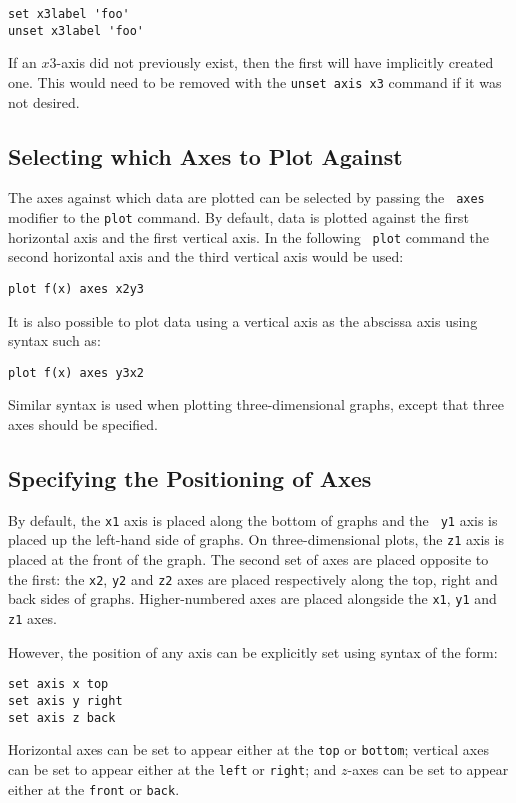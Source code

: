 \begin{verbatim}
set x3label 'foo'
unset x3label 'foo'
\end{verbatim}

\noindent If an $x3$-axis did not previously exist, then the first will have
implicitly created one. This would need to be removed with the {\tt unset axis
x3} command if it was not desired.

\subsection{Selecting which Axes to Plot Against}

The axes against which data are plotted can be selected by passing the {\tt
axes} modifier to the {\tt plot} command. By default, data is plotted against
the first horizontal axis and the first vertical axis. In the following {\tt
plot} command the second horizontal axis and the third vertical axis would be
used:
\begin{verbatim}
plot f(x) axes x2y3
\end{verbatim}
It is also possible to plot data using a vertical axis as the abscissa axis
using syntax such as:
\begin{verbatim}
plot f(x) axes y3x2
\end{verbatim}
Similar syntax is used when plotting three-dimensional graphs, except that
three axes should be specified.

\subsection{Specifying the Positioning of Axes}

By default, the {\tt x1} axis is placed along the bottom of graphs and the {\tt
y1} axis is placed up the left-hand side of graphs. On three-dimensional plots,
the {\tt z1} axis is placed at the front of the graph. The second set of axes
are placed opposite to the first: the {\tt x2}, {\tt y2} and {\tt z2} axes are
placed respectively along the top, right and back sides of graphs.
Higher-numbered axes are placed alongside the {\tt x1}, {\tt y1} and {\tt z1}
axes.

However, the position of any axis can be explicitly set using syntax of the
form:
\begin{verbatim}
set axis x top
set axis y right
set axis z back
\end{verbatim}
Horizontal axes can be set to appear either at the {\tt top} or {\tt bottom};
vertical axes can be set to appear either at the {\tt left} or {\tt right}; and
$z$-axes can be set to appear either at the {\tt front} or {\tt back}.

